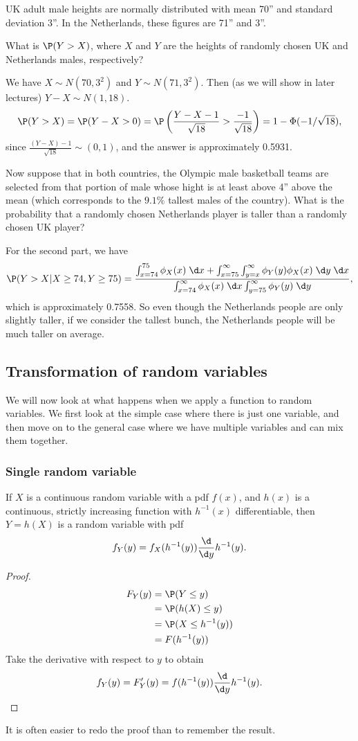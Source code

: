 \documentclass[a4paper]{article}
\begin{document}
\begin{eg}
  UK adult male heights are normally distributed with mean 70'' and standard deviation 3''. In the Netherlands, these figures are 71'' and 3''.

  What is $\P(Y > X)$, where $X$ and $Y$ are the heights of randomly chosen UK and Netherlands males, respectively?

  We have $X\sim N(70, 3^2)$ and $Y\sim N(71, 3^2)$. Then (as we will show in later lectures) $Y - X \sim N(1, 18)$.
  \[
    \P(Y > X) = \P(Y - X > 0) = \P\left(\frac{Y - X - 1}{\sqrt{18}} > \frac{-1}{\sqrt{18}}\right) = 1 - \Phi(-1/\sqrt{18}),
  \]
  since $\frac{(Y - X) - 1}{\sqrt{18}}\sim (0, 1)$, and the answer is approximately 0.5931.

  Now suppose that in both countries, the Olympic male basketball teams are selected from that portion of male whose hight is at least above 4'' above the mean (which corresponds to the $9.1\%$ tallest males of the country). What is the probability that a randomly chosen Netherlands player is taller than a randomly chosen UK player?

  For the second part, we have
  \[
    \P(Y > X|X \geq 74, Y \geq 75) = \frac{\int_{x = 74}^{75} \phi_X(x)\;\d x + \int_{x = 75}^\infty \int_{y=x}^\infty \phi_Y(y)\phi_X(x)\;\d y\;\d x}{\int_{x=74}^\infty \phi_X(x)\;\d x \int_{y=75}^\infty \phi_Y(y)\;\d y},
  \]
  which is approximately 0.7558. So even though the Netherlands people are only slightly taller, if we consider the tallest bunch, the Netherlands people will be much taller on average.
\end{eg}

\subsection{Transformation of random variables}
We will now look at what happens when we apply a function to random variables. We first look at the simple case where there is just one variable, and then move on to the general case where we have multiple variables and can mix them together.
\subsubsection*{Single random variable}
\begin{thm}
  If $X$ is a continuous random variable with a pdf $f(x)$, and $h(x)$ is a continuous, strictly increasing function with $h^{-1}(x)$ differentiable, then $Y = h(X)$ is a random variable with pdf
  \[
    f_Y(y) = f_X(h^{-1}(y))\frac{\d }{\d y}h^{-1}(y).
  \]
\end{thm}
\begin{proof}
  \begin{align*}
    F_Y(y) &= \P(Y \leq y)\\
    &= \P(h(X) \leq y)\\
    &= \P(X \leq h^{-1}(y))\\
    &= F(h^{-1}(y))
  \end{align*}
  Take the derivative with respect to $y$ to obtain
  \[
    f_Y(y) = F'_Y(y) = f(h^{-1}(y))\frac{\d}{\d y}h^{-1}(y).
  \]
\end{proof}
It is often easier to redo the proof than to remember the result.
\end{document}
